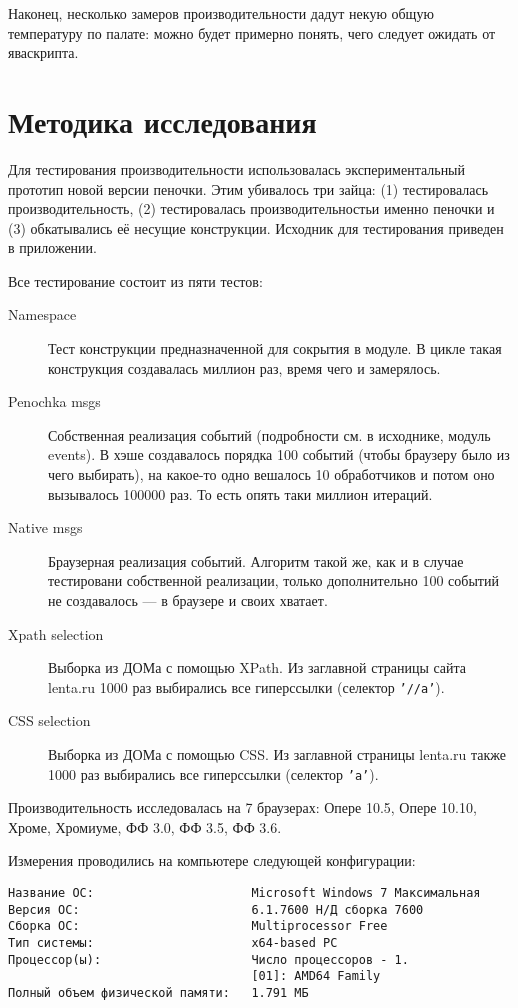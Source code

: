 \documentclass[a4papre,12pt]{article}
\begin{document}
Наконец, несколько замеров производительности дадут некую общую температуру
по палате: можно будет примерно понять, чего следует ожидать от яваскрипта.

\section{Методика исследования}

Для тестирования производительности использовалась экспериментальный
прототип новой версии пеночки. Этим убивалось три зайца: (1) тестировалась
производительность, (2) тестировалась производительностьи именно пеночки и
(3) обкатывались её несущие конструкции. Исходник для тестирования приведен
в приложении.

Все тестирование состоит из пяти тестов:
\begin{description}
\item[Namespace] Тест конструкции предназначенной для сокрытия в модуле. В
  цикле такая конструкция создавалась миллион раз, время чего и замерялось.
\item[Penochka msgs] Собственная реализация событий (подробности см. в
  исходнике, модуль events). В хэше создавалось порядка 100 событий (чтобы
  браузеру было из чего выбирать), на какое-то одно вешалось 10
  обработчиков и потом оно вызывалось 100000 раз. То есть опять таки
  миллион итераций.
\item[Native msgs] Браузерная реализация событий. Алгоритм такой же, как и
  в случае тестировани собственной реализации, только дополнительно 100 
  событий не создавалось --- в браузере и своих хватает.
\item[Xpath selection] Выборка из ДОМа с помощью XPath. Из заглавной
  страницы сайта lenta.ru 1000 раз выбирались все гиперссылки (селектор
  {\tt '//a'}).

\item[CSS selection] Выборка из ДОМа с помощью CSS. Из заглавной страницы
  lenta.ru также 1000 раз выбирались все гиперссылки (селектор {\tt 'a'}).
\end{description}

Производительность исследовалась на 7 браузерах: Опере 10.5, Опере 10.10,
Хроме, Хромиуме, ФФ 3.0, ФФ 3.5, ФФ 3.6.

Измерения проводились на компьютере следующей конфигурации:

\begin{verbatim}
Название ОС:                      Microsoft Windows 7 Максимальная
Версия ОС:                        6.1.7600 Н/Д сборка 7600
Сборка ОС:                        Multiprocessor Free
Тип системы:                      x64-based PC
Процессор(ы):                     Число процессоров - 1.
                                  [01]: AMD64 Family 
Полный объем физической памяти:   1.791 МБ
\end{verbatim}
\end{document}
